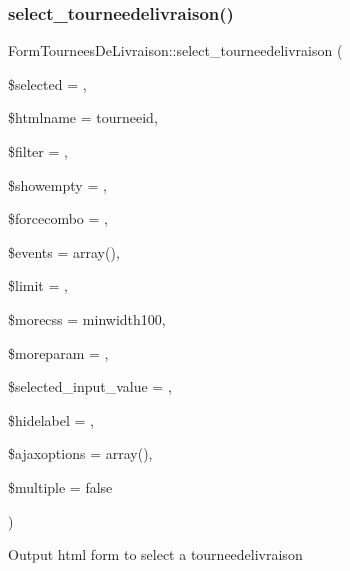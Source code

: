 \subsubsection{\texorpdfstring{select\+\_\+tourneedelivraison()}{select\_tourneedelivraison()}}
{\footnotesize\ttfamily Form\+Tournees\+De\+Livraison\+::select\+\_\+tourneedelivraison (\begin{DoxyParamCaption}\item[{}]{\$selected = {\ttfamily \textquotesingle{}\textquotesingle{}},  }\item[{}]{\$htmlname = {\ttfamily \textquotesingle{}tourneeid\textquotesingle{}},  }\item[{}]{\$filter = {\ttfamily \textquotesingle{}\textquotesingle{}},  }\item[{}]{\$showempty = {\ttfamily \textquotesingle{}\textquotesingle{}},  }\item[{}]{\$forcecombo = {},  }\item[{}]{\$events = {\ttfamily array()},  }\item[{}]{\$limit = {},  }\item[{}]{\$morecss = {\ttfamily \textquotesingle{}minwidth100\textquotesingle{}},  }\item[{}]{\$moreparam = {\ttfamily \textquotesingle{}\textquotesingle{}},  }\item[{}]{\$selected\+\_\+input\+\_\+value = {\ttfamily \textquotesingle{}\textquotesingle{}},  }\item[{}]{\$hidelabel = {},  }\item[{}]{\$ajaxoptions = {\ttfamily array()},  }\item[{}]{\$multiple = {\ttfamily false} }\end{DoxyParamCaption})}

Output html form to select a tourneedelivraison


